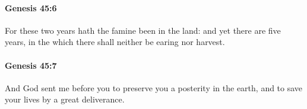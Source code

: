 		\paragraph{Genesis 45:6} %
			\label{GENESIS-45-6}

			For these two years hath the famine been in the land: and yet there are five years, in the which there shall neither be earing nor harvest.


		\paragraph{Genesis 45:7} %
			\label{GENESIS-45-7}

			And God sent me before you to preserve you a posterity in the earth, and to save your lives by a great deliverance.


